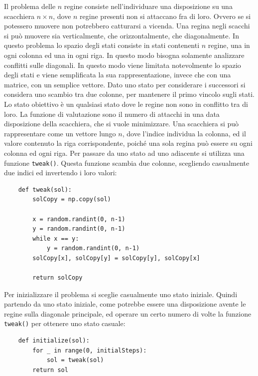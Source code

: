\documentclass{article}
\numberwithin{equation}{subsection}
\begin{document}
Il problema delle $n$ regine consiste nell'individuare una disposizione su una scacchiera $n\times n$, dove $n$ regine presenti non si attaccano fra di loro. Ovvero se si potessero muovere non potrebbero 
catturarsi a vicenda. Una regina negli scacchi si può muovere sia verticalmente, che orizzontalmente, che diagonalmente. 
In questo problema lo spazio degli stati consiste in stati contenenti $n$ regine, una in ogni colonna ed una in ogni riga. In questo modo bisogna solamente analizzare conflitti sulle diagonali. In questo modo 
viene limitata notevolmente lo spazio degli stati e viene semplificata la sua rappresentazione, invece che con una matrice, con un semplice vettore. 
Dato uno stato per considerare i successori si considera uno scambio tra due colonne, per mantenere il primo vincolo sugli stati. 
Lo stato obiettivo è un qualsiasi stato dove le regine non sono in conflitto tra di loro. La funzione di valutazione sono il numero di attacchi in una data disposizione della scacchiera, che si vuole 
minimizzare. 
Una scacchiera si può rappresentare come un vettore lungo $n$, dove l'indice individua la colonna, ed il valore contenuto la riga corrispondente, poiché una sola regina può essere su ogni colonna ed ogni riga. 
Per passare da uno stato ad uno adiacente si utilizza una funzione \verb|tweak()|. Questa funzione scambia due colonne, scegliendo casualmente due indici ed invertendo i loro valori:
\begin{verbatim}
    def tweak(sol):
        solCopy = np.copy(sol)

        x = random.randint(0, n-1)
        y = random.randint(0, n-1)
        while x == y:
            y = random.randint(0, n-1)
        solCopy[x], solCopy[y] = solCopy[y], solCopy[x]

        return solCopy
\end{verbatim}

Per inizializzare il problema si sceglie casualmente uno stato iniziale. Quindi partendo da uno stato iniziale, come potrebbe essere una disposizione avente le regine sulla diagonale principale, ed operare 
un certo numero di volte la funzione \verb|tweak()| per ottenere uno stato casuale:
\begin{verbatim}
    def initialize(sol):
        for _ in range(0, initialSteps):
            sol = tweak(sol)
        return sol
\end{verbatim}
\end{document}
